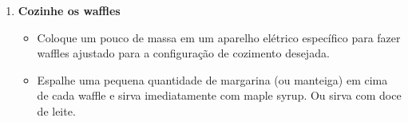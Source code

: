\documentclass [11pt, letterpaper] {article}
\begin{document}
\begin {description}
\begin {enumerate}
\item {\bf Cozinhe os waffles}
\begin {itemize}
\item Coloque um pouco de massa em um aparelho elétrico espec\'ifico para fazer waffles ajustado para a configuração de cozimento desejada.
\item Espalhe uma pequena quantidade de margarina (ou manteiga) em cima de cada waffle e sirva imediatamente com maple syrup. Ou sirva com doce de leite.
\end {itemize}

\end {enumerate}
\end {description}
\end{document}
